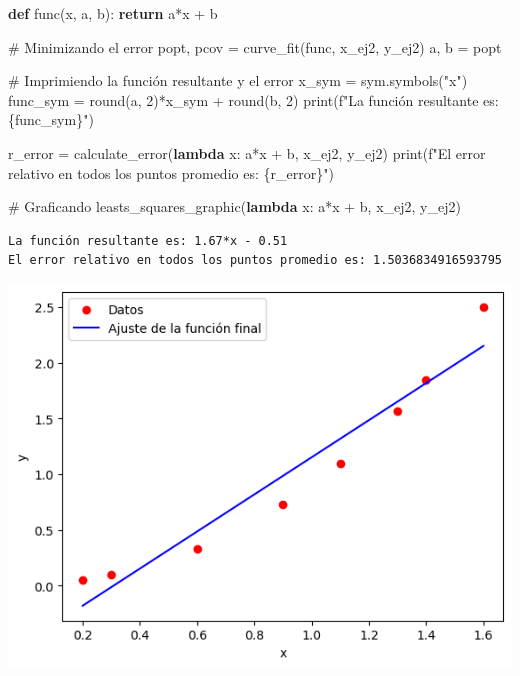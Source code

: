 \documentclass[
  letterpaper,
  DIV=11,
  numbers=noendperiod]{scrartcl}
\newenvironment{Shaded}{\begin{snugshade}}{\end{snugshade}}
\newcommand{\BuiltInTok}[1]{\textcolor[rgb]{0.00,0.23,0.31}{#1}}
\newcommand{\CommentTok}[1]{\textcolor[rgb]{0.37,0.37,0.37}{#1}}
\newcommand{\ControlFlowTok}[1]{\textcolor[rgb]{0.00,0.23,0.31}{\textbf{#1}}}
\newcommand{\DecValTok}[1]{\textcolor[rgb]{0.68,0.00,0.00}{#1}}
\newcommand{\KeywordTok}[1]{\textcolor[rgb]{0.00,0.23,0.31}{\textbf{#1}}}
\newcommand{\NormalTok}[1]{\textcolor[rgb]{0.00,0.23,0.31}{#1}}
\newcommand{\OperatorTok}[1]{\textcolor[rgb]{0.37,0.37,0.37}{#1}}
\newcommand{\SpecialCharTok}[1]{\textcolor[rgb]{0.37,0.37,0.37}{#1}}
\newcommand{\SpecialStringTok}[1]{\textcolor[rgb]{0.13,0.47,0.30}{#1}}
\newcommand{\StringTok}[1]{\textcolor[rgb]{0.13,0.47,0.30}{#1}}
\begin{document}
\begin{Shaded}
\begin{Highlighting}[]

\KeywordTok{def}\NormalTok{ func(x, a, b):}
    \ControlFlowTok{return}\NormalTok{ a}\OperatorTok{*}\NormalTok{x }\OperatorTok{+}\NormalTok{ b}

\CommentTok{\# Minimizando el error}
\NormalTok{popt, pcov }\OperatorTok{=}\NormalTok{ curve\_fit(func, x\_ej2, y\_ej2)}
\NormalTok{a, b }\OperatorTok{=}\NormalTok{ popt}

\CommentTok{\# Imprimiendo la función resultante y el error}
\NormalTok{x\_sym }\OperatorTok{=}\NormalTok{ sym.symbols(}\StringTok{"x"}\NormalTok{)}
\NormalTok{func\_sym }\OperatorTok{=} \BuiltInTok{round}\NormalTok{(a, }\DecValTok{2}\NormalTok{)}\OperatorTok{*}\NormalTok{x\_sym }\OperatorTok{+} \BuiltInTok{round}\NormalTok{(b, }\DecValTok{2}\NormalTok{)}
\BuiltInTok{print}\NormalTok{(}\SpecialStringTok{f"La función resultante es: }\SpecialCharTok{\{}\NormalTok{func\_sym}\SpecialCharTok{\}}\SpecialStringTok{"}\NormalTok{)}

\NormalTok{r\_error }\OperatorTok{=}\NormalTok{ calculate\_error(}\KeywordTok{lambda}\NormalTok{ x: a}\OperatorTok{*}\NormalTok{x }\OperatorTok{+}\NormalTok{ b, x\_ej2, y\_ej2)}
\BuiltInTok{print}\NormalTok{(}\SpecialStringTok{f"El error relativo en todos los puntos promedio es: }\SpecialCharTok{\{}\NormalTok{r\_error}\SpecialCharTok{\}}\SpecialStringTok{"}\NormalTok{)}

\CommentTok{\# Graficando}
\NormalTok{leasts\_squares\_graphic(}\KeywordTok{lambda}\NormalTok{ x: a}\OperatorTok{*}\NormalTok{x }\OperatorTok{+}\NormalTok{ b, x\_ej2, y\_ej2)}
\end{Highlighting}
\end{Shaded}

\begin{verbatim}
La función resultante es: 1.67*x - 0.51
El error relativo en todos los puntos promedio es: 1.5036834916593795
\end{verbatim}

\includegraphics{Tarea8_MN_files/figure-pdf/cell-10-output-2.png}
\end{document}
